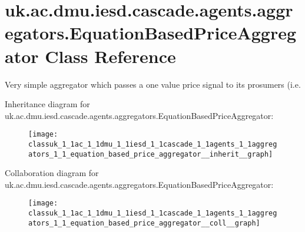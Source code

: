 \hypertarget{classuk_1_1ac_1_1dmu_1_1iesd_1_1cascade_1_1agents_1_1aggregators_1_1_equation_based_price_aggregator}{\section{uk.\-ac.\-dmu.\-iesd.\-cascade.\-agents.\-aggregators.\-Equation\-Based\-Price\-Aggregator Class Reference}
\label{classuk_1_1ac_1_1dmu_1_1iesd_1_1cascade_1_1agents_1_1aggregators_1_1_equation_based_price_aggregator}
}


Very simple aggregator which passes a one value price signal to its prosumers (i.\-e.  




Inheritance diagram for uk.\-ac.\-dmu.\-iesd.\-cascade.\-agents.\-aggregators.\-Equation\-Based\-Price\-Aggregator\-:\nopagebreak
\begin{figure}[H]
\begin{center}
\leavevmode
\texttt{[image: classuk\_1\_1ac\_1\_1dmu\_1\_1iesd\_1\_1cascade\_1\_1agents\_1\_1aggregators\_1\_1\_equation\_based\_price\_aggregator\_\_inherit\_\_graph]}
\end{center}
\end{figure}


Collaboration diagram for uk.\-ac.\-dmu.\-iesd.\-cascade.\-agents.\-aggregators.\-Equation\-Based\-Price\-Aggregator\-:\nopagebreak
\begin{figure}[H]
\begin{center}
\leavevmode
\texttt{[image: classuk\_1\_1ac\_1\_1dmu\_1\_1iesd\_1\_1cascade\_1\_1agents\_1\_1aggregators\_1\_1\_equation\_based\_price\_aggregator\_\_coll\_\_graph]}
\end{center}
\end{figure}

